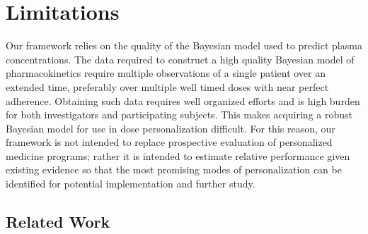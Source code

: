 \section{Limitations}



Our framework relies on the quality of the Bayesian model used to predict plasma concentrations. The data required to construct a high quality Bayesian model of pharmacokinetics require multiple observations of a single patient over an extended time, preferably over multiple well timed doses with near perfect adherence.  Obtaining such data requires well organized efforts and is high burden for both investigators and participating subjects.  This makes acquiring a robust Bayesian model for use in dose personalization difficult. For this reason, our framework is not intended to replace prospective evaluation of personalized medicine programs; rather it is intended to estimate relative performance given existing evidence so that the most promising modes of personalization can be identified for potential implementation and further study.


\subsection{Related Work}

